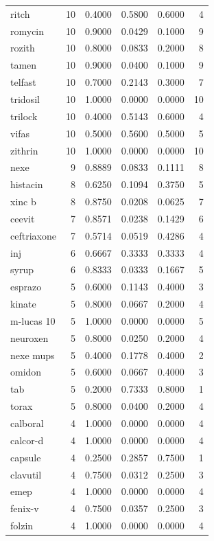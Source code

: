 \begin{longtable}{p{3.0cm}rrrrr}
ritch & 10 & 0.4000 & 0.5800 & 0.6000 & 4 \\
romycin & 10 & 0.9000 & 0.0429 & 0.1000 & 9 \\
rozith & 10 & 0.8000 & 0.0833 & 0.2000 & 8 \\
tamen & 10 & 0.9000 & 0.0400 & 0.1000 & 9 \\
telfast & 10 & 0.7000 & 0.2143 & 0.3000 & 7 \\
tridosil & 10 & 1.0000 & 0.0000 & 0.0000 & 10 \\
trilock & 10 & 0.4000 & 0.5143 & 0.6000 & 4 \\
vifas & 10 & 0.5000 & 0.5600 & 0.5000 & 5 \\
zithrin & 10 & 1.0000 & 0.0000 & 0.0000 & 10 \\
nexe & 9 & 0.8889 & 0.0833 & 0.1111 & 8 \\
histacin & 8 & 0.6250 & 0.1094 & 0.3750 & 5 \\
xinc b & 8 & 0.8750 & 0.0208 & 0.0625 & 7 \\
ceevit & 7 & 0.8571 & 0.0238 & 0.1429 & 6 \\
ceftriaxone & 7 & 0.5714 & 0.0519 & 0.4286 & 4 \\
inj & 6 & 0.6667 & 0.3333 & 0.3333 & 4 \\
syrup & 6 & 0.8333 & 0.0333 & 0.1667 & 5 \\
esprazo & 5 & 0.6000 & 0.1143 & 0.4000 & 3 \\
kinate & 5 & 0.8000 & 0.0667 & 0.2000 & 4 \\
m-lucas 10 & 5 & 1.0000 & 0.0000 & 0.0000 & 5 \\
neuroxen & 5 & 0.8000 & 0.0250 & 0.2000 & 4 \\
nexe mups & 5 & 0.4000 & 0.1778 & 0.4000 & 2 \\
omidon & 5 & 0.6000 & 0.0667 & 0.4000 & 3 \\
tab & 5 & 0.2000 & 0.7333 & 0.8000 & 1 \\
torax & 5 & 0.8000 & 0.0400 & 0.2000 & 4 \\
calboral & 4 & 1.0000 & 0.0000 & 0.0000 & 4 \\
calcor-d & 4 & 1.0000 & 0.0000 & 0.0000 & 4 \\
capsule & 4 & 0.2500 & 0.2857 & 0.7500 & 1 \\
clavutil & 4 & 0.7500 & 0.0312 & 0.2500 & 3 \\
emep & 4 & 1.0000 & 0.0000 & 0.0000 & 4 \\
fenix-v & 4 & 0.7500 & 0.0357 & 0.2500 & 3 \\
folzin & 4 & 1.0000 & 0.0000 & 0.0000 & 4 \\

\end{longtable}
